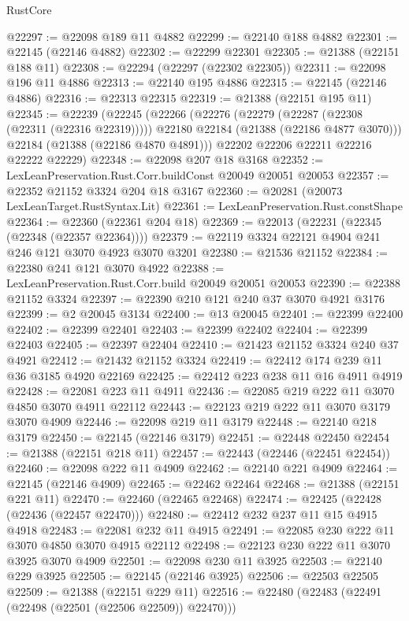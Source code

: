 \begin{lexlean}{RustCore}
\begin{coremodule}
@22297 := @22098 @189 @11 @4882
@22299 := @22140 @188 @4882
@22301 := @22145 (@22146 @4882)
@22302 := @22299 @22301
@22305 := @21388 (@22151 @188 @11)
@22308 := @22294 (@22297 (@22302 @22305))
@22311 := @22098 @196 @11 @4886
@22313 := @22140 @195 @4886
@22315 := @22145 (@22146 @4886)
@22316 := @22313 @22315
@22319 := @21388 (@22151 @195 @11)
@22345 := @22239
    (@22245
      (@22266
        (@22276
          (@22279 (@22287 (@22308 (@22311 (@22316 @22319)))))
          @22180
          @22184
          (@21388 (@22186 @4877 @3070)))
        @22184
        (@21388 (@22186 @4870 @4891)))
      @22202
      @22206
      @22211
      @22216
      @22222
      @22229)
@22348 := @22098 @207 @18 @3168
@22352 := LexLeanPreservation.Rust.Corr.buildConst @20049 @20051 @20053
@22357 := @22352 @21152 @3324 @204 @18 @3167
@22360 := @20281 (@20073 LexLeanTarget.RustSyntax.Lit)
@22361 := LexLeanPreservation.Rust.constShape
@22364 := @22360 (@22361 @204 @18)
@22369 := @22013 (@22231 (@22345 (@22348 (@22357 @22364))))
@22379 := @22119 @3324 @22121 @4904 @241 @246 @121 @3070 @4923 @3070 @3201
@22380 := @21536 @21152
@22384 := @22380 @241 @121 @3070 @4922
@22388 := LexLeanPreservation.Rust.Corr.build @20049 @20051 @20053
@22390 := @22388 @21152 @3324
@22397 := @22390 @210 @121 @240 @37 @3070 @4921 @3176
@22399 := @2 @20045 @3134
@22400 := @13 @20045
@22401 := @22399 @22400
@22402 := @22399 @22401
@22403 := @22399 @22402
@22404 := @22399 @22403
@22405 := @22397 @22404
@22410 := @21423 @21152 @3324 @240 @37 @4921
@22412 := @21432 @21152 @3324
@22419 := @22412 @174 @239 @11 @36 @3185 @4920 @22169
@22425 := @22412 @223 @238 @11 @16 @4911 @4919
@22428 := @22081 @223 @11 @4911
@22436 := @22085 @219 @222 @11 @3070 @4850 @3070 @4911 @22112
@22443 := @22123 @219 @222 @11 @3070 @3179 @3070 @4909
@22446 := @22098 @219 @11 @3179
@22448 := @22140 @218 @3179
@22450 := @22145 (@22146 @3179)
@22451 := @22448 @22450
@22454 := @21388 (@22151 @218 @11)
@22457 := @22443 (@22446 (@22451 @22454))
@22460 := @22098 @222 @11 @4909
@22462 := @22140 @221 @4909
@22464 := @22145 (@22146 @4909)
@22465 := @22462 @22464
@22468 := @21388 (@22151 @221 @11)
@22470 := @22460 (@22465 @22468)
@22474 := @22425 (@22428 (@22436 (@22457 @22470)))
@22480 := @22412 @232 @237 @11 @15 @4915 @4918
@22483 := @22081 @232 @11 @4915
@22491 := @22085 @230 @222 @11 @3070 @4850 @3070 @4915 @22112
@22498 := @22123 @230 @222 @11 @3070 @3925 @3070 @4909
@22501 := @22098 @230 @11 @3925
@22503 := @22140 @229 @3925
@22505 := @22145 (@22146 @3925)
@22506 := @22503 @22505
@22509 := @21388 (@22151 @229 @11)
@22516 := @22480 (@22483 (@22491 (@22498 (@22501 (@22506 @22509)) @22470)))

\end{coremodule}
\end{lexlean}
